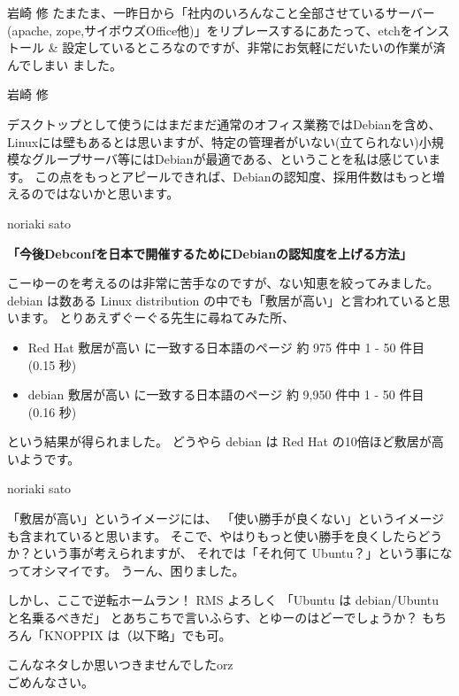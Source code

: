 \documentclass[cjk,dvipdfmx,12pt]{beamer}
\begin{document}
\begin{frame}{岩崎 修}
たまたま、一昨日から「社内のいろんなこと全部させているサーバー(apache,
zope,サイボウズOffice他)」をリプレースするにあたって、etchをインストール
\& 設定しているところなのですが、非常にお気軽にだいたいの作業が済んでしまい
ました。

\end{frame}\begin{frame}{岩崎 修}

デスクトップとして使うにはまだまだ通常のオフィス業務ではDebianを含め、Linuxには壁もあるとは思いますが、特定の管理者がいない(立てられない)小規模なグループサーバ等にはDebianが最適である、ということを私は感じています。
この点をもっとアピールできれば、Debianの認知度、採用件数はもっと増えるのではないかと思います。


\end{frame}\begin{frame}{noriaki sato}

\textbf{「今後Debconfを日本で開催するためにDebianの認知度を上げる方法」}

こーゆーのを考えるのは非常に苦手なのですが、ない知恵を絞ってみました。
debian は数ある Linux distribution の中でも「敷居が高い」と言われていると思います。
とりあえずぐーぐる先生に尋ねてみた所、

\begin{itemize}
 \item  Red Hat 敷居が高い  に一致する日本語のページ 約 975 件中 1 - 50 件目 (0.15 秒) 
 \item  debian 敷居が高い に一致する日本語のページ 約 9,950 件中 1 - 50 件目 (0.16 秒) 
\end{itemize}

という結果が得られました。
どうやら debian は Red Hat の10倍ほど敷居が高いようです。

\end{frame}\begin{frame}{noriaki sato}

「敷居が高い」というイメージには、
「使い勝手が良くない」というイメージも含まれていると思います。
そこで、やはりもっと使い勝手を良くしたらどうか？という事が考えられますが、
それでは「それ何て Ubuntu？」という事になってオシマイです。
うーん、困りました。

しかし、ここで逆転ホームラン！
RMS よろしく
「Ubuntu は debian/Ubuntu と名乗るべきだ」
とあちこちで言いふらす、とゆーのはどーでしょうか？
もちろん「KNOPPIX は（以下略」でも可。

こんなネタしか思いつきませんでしたorz\\
ごめんなさい。


\end{frame}
\end{document}
